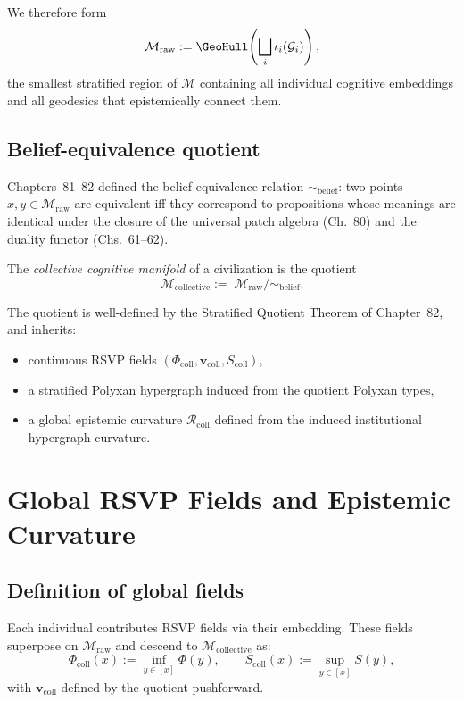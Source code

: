 We therefore form
\[
  \mathcal{M}_{\mathrm{raw}}
  := \GeoHull\!\left(\bigsqcup_i \iota_i(\mathcal{G}_i)\right),
\]
the smallest stratified region of $\mathcal{M}$ containing all
individual cognitive embeddings and all geodesics that epistemically
connect them.

\subsection{Belief-equivalence quotient}
Chapters~81--82 defined the belief-equivalence relation
$\sim_{\mathrm{belief}}$:
two points $x,y \in \mathcal{M}_{\mathrm{raw}}$ are equivalent iff
they correspond to propositions whose meanings are identical under the
closure of the universal patch algebra (Ch.~80) and the duality functor
(Chs.~61--62).

\begin{definition}
The \emph{collective cognitive manifold} of a civilization is the
quotient
\[
  \mathcal{M}_{\mathrm{collective}}
  :=\;
  \mathcal{M}_{\mathrm{raw}}
  \big/
  \!\sim_{\mathrm{belief}}.
\]
\end{definition}

The quotient is well-defined by the Stratified Quotient Theorem of
Chapter~82, and inherits:
\begin{itemize}
\item continuous RSVP fields $(\Phi_{\mathrm{coll}},
  \mathbf{v}_{\mathrm{coll}}, S_{\mathrm{coll}})$,
\item a stratified Polyxan hypergraph induced from the quotient
      Polyxan types,
\item a global epistemic curvature
      $\mathcal{R}_{\mathrm{coll}}$ defined from the induced
      institutional hypergraph curvature.
\end{itemize}


\section{Global RSVP Fields and Epistemic Curvature}

\subsection{Definition of global fields}
Each individual contributes RSVP fields via their embedding.
These fields superpose on $\mathcal{M}_{\mathrm{raw}}$ and descend to
$\mathcal{M}_{\mathrm{collective}}$ as:
\[
  \Phi_{\mathrm{coll}}(x)
    := \inf_{y \in [x]} \Phi(y),\qquad
  S_{\mathrm{coll}}(x)
    := \sup_{y \in [x]} S(y),
\]
with $\mathbf{v}_{\mathrm{coll}}$ defined by the quotient pushforward.

